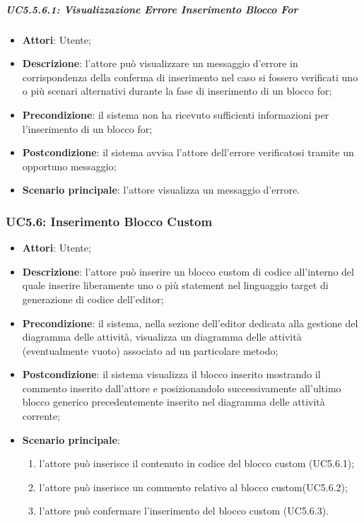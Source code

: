 \subparagraph{UC5.5.6.1: Visualizzazione Errore Inserimento Blocco For}
\label{UC5.5.6.1}
\begin{itemize}
\item \textbf{Attori}: Utente;
\item \textbf{Descrizione}: l'attore può visualizzare un messaggio d'errore in corrispondenza della conferma di inserimento nel caso si fossero verificati uno o più scenari alternativi durante la fase di inserimento di un blocco for;	
\item \textbf{Precondizione}: il sistema non ha ricevuto sufficienti informazioni per l'inserimento di un blocco for;	
\item \textbf{Postcondizione}: il sistema avvisa l'attore dell'errore verificatosi tramite un opportuno messaggio;	
\item \textbf{Scenario principale}:
l'attore visualizza un messaggio d'errore.	
\end{itemize}

\subsubsection{UC5.6: Inserimento Blocco Custom	}
\label{UC5.6}
\begin{itemize}
\item \textbf{Attori}: Utente;
\item \textbf{Descrizione}: l'attore può inserire un blocco custom di codice all'interno del quale inserire liberamente uno o più statement nel linguaggio target di generazione di codice dell'editor;	
\item \textbf{Precondizione}: il sistema, nella sezione dell'editor dedicata alla gestione del diagramma delle attività, visualizza un diagramma delle attività (eventualmente vuoto) associato ad un particolare metodo;	
\item \textbf{Postcondizione}: il sistema visualizza il blocco inserito mostrando il commento inserito dall'attore e posizionandolo successivamente all'ultimo blocco generico precedentemente 
inserito nel diagramma delle attività corrente;	
\item \textbf{Scenario principale}:
\begin{enumerate}
\item l'attore può inserisce il contenuto in codice del blocco custom (UC5.6.1);
\item l'attore può inserisce un commento relativo al blocco custom(UC5.6.2);
\item l'attore può confermare l'inserimento del blocco custom (UC5.6.3).	
\end{enumerate}
\end{itemize}

